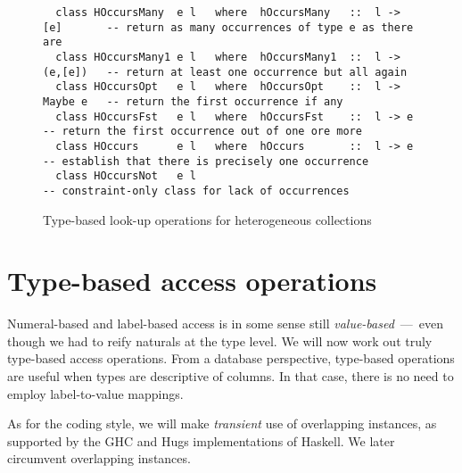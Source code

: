 \documentclass[nocopyrightspace,preprint]{sigplan-proc}
\newenvironment{mybox}{%
\begin{boxedminipage}{\hsize}%
\medskip
}{%
\medskip
\end{boxedminipage}%
\medskip
}
\begin{document}
\begin{figure*}[t!]
\begin{mybox}

\vspace{-32\in}

{\small
\begin{verbatim}
  class HOccursMany  e l   where  hOccursMany   ::  l -> [e]       -- return as many occurrences of type e as there are
  class HOccursMany1 e l   where  hOccursMany1  ::  l -> (e,[e])   -- return at least one occurrence but all again
  class HOccursOpt   e l   where  hOccursOpt    ::  l -> Maybe e   -- return the first occurrence if any
  class HOccursFst   e l   where  hOccursFst    ::  l -> e         -- return the first occurrence out of one ore more
  class HOccurs      e l   where  hOccurs       ::  l -> e         -- establish that there is precisely one occurrence
  class HOccursNot   e l                                           -- constraint-only class for lack of occurrences
\end{verbatim}
}

\vspace{-32\in}

\end{mybox}
\caption{Type-based look-up operations for heterogeneous collections}
\label{F:HOccurs}
\vspace{-32\in}
\end{figure*}






\section{Type-based access operations}
\label{S:Type}

Numeral-based and label-based access is in some sense still
\emph{value-based}~---~even though we had to reify naturals at the
type level. We will now work out truly type-based access operations.
From a database perspective, type-based operations are useful when
types are descriptive of columns. In that case, there is no need
to employ label-to-value mappings.

As for the coding style, we will make \emph{transient} use of
overlapping instances, as supported by the GHC and Hugs
implementations of Haskell. We later circumvent overlapping instances.
\end{document}
